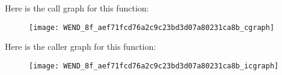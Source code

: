 Here is the call graph for this function\+:\nopagebreak
\begin{figure}[H]
\begin{center}
\leavevmode
\texttt{[image: WEND\_8f\_aef71fcd76a2c9c23bd3d07a80231ca8b\_cgraph]}
\end{center}
\end{figure}




Here is the caller graph for this function\+:\nopagebreak
\begin{figure}[H]
\begin{center}
\leavevmode
\texttt{[image: WEND\_8f\_aef71fcd76a2c9c23bd3d07a80231ca8b\_icgraph]}
\end{center}
\end{figure}


